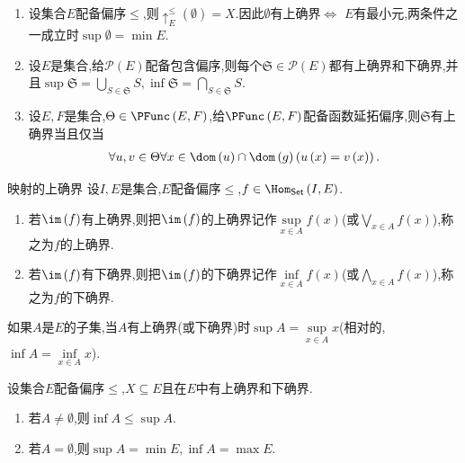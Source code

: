 \begin{example}{}{}
	\begin{enumerate}
		\item 设集合$E$配备偏序$\leq$,则$\uparrow_{E}^{\leq}\left(\emptyset\right)=X$.因此$\emptyset$有上确界$\iff$ $E$有最小元,两条件之一成立时$\sup\emptyset=\min E$.
		\item 设$E$是集合,给$\mathcal{P}\left(E\right)$配备包含偏序,则每个$\mathfrak{S}\in\mathcal{P}\left(E\right)$都有上确界和下确界,并且$\sup\mathfrak{S}=\bigcup\limits_{S\in\mathfrak{S}}S,\inf\mathfrak{S}=\bigcap\limits_{S\in\mathfrak{S}}S$.
		\item 设$E,F$是集合,$\Theta\in\PFunc\left(E,F\right)$,给$\PFunc\left(E,F\right)$配备函数延拓偏序,则$\mathfrak{S}$有上确界当且仅当
		\begin{align*}
			\forall u,v\in\Theta\forall x\in\dom\left(u\right)\cap\dom\left(g\right)\left(u\left(x\right)=v\left(x\right)\right).
		\end{align*}
	\end{enumerate}
\end{example}

\begin{definition}{映射的上确界}{}
	设$I,E$是集合,$E$配备偏序$\leq$,$f\in\Hom_{\mathsf{Set}}\left(I,E\right)$.
	\begin{enumerate}
		\item 若$\im\left(f\right)$有上确界,则把$\im\left(f\right)$的上确界记作$\sup\limits_{x\in A}f\left(x\right)$(或$\bigvee\limits_{x\in A}f\left(x\right)$),称之为$f$的上确界.
		\item 若$\im\left(f\right)$有下确界,则把$\im\left(f\right)$的下确界记作$\inf\limits_{x\in A}f\left(x\right)$(或$\bigwedge\limits_{x\in A}f\left(x\right)$),称之为$f$的下确界.
	\end{enumerate}
\end{definition}

\begin{remark}{}{}
	如果$A$是$E$的子集,当$A$有上确界(或下确界)时$\sup A=\sup\limits_{x\in A}x$(相对的,$\inf A=\inf\limits_{x\in A}x$).
\end{remark}

\begin{proposition}{}{}
	设集合$E$配备偏序$\leq$,$X\subseteq E$且在$E$中有上确界和下确界.
	\begin{enumerate}
		\item 若$A\neq\emptyset$,则$\inf A\leq\sup A$.
		\item 若$A=\emptyset$,则$\sup A=\min E,\inf A=\max E$.
	\end{enumerate}
\end{proposition}


